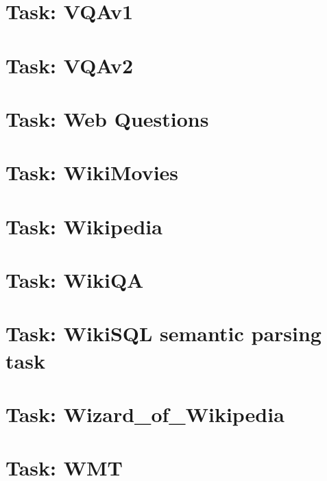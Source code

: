 \documentclass[twoside]{book}
\newcommand{\+}{\discretionary{\mbox{\scriptsize$\hookleftarrow$}}{}{}}
\begin{document}
\chapter{Task\+: V\+Q\+Av1}
\label{md_parlai_tasks_vqa_v1_README}

\chapter{Task\+: V\+Q\+Av2}
\label{md_parlai_tasks_vqa_v2_README}

\chapter{Task\+: Web Questions}
\label{md_parlai_tasks_webquestions_README}

\chapter{Task\+: Wiki\+Movies}
\label{md_parlai_tasks_wikimovies_README}

\chapter{Task\+: Wikipedia}
\label{md_parlai_tasks_wikipedia_README}

\chapter{Task\+: Wiki\+QA}
\label{md_parlai_tasks_wikiqa_README}

\chapter{Task\+: Wiki\+S\+QL semantic parsing task}
\label{md_parlai_tasks_wikisql_README}

\chapter{Task\+: Wizard\+\_\+of\+\_\+\+Wikipedia}
\label{md_parlai_tasks_wizard_of_wikipedia_README}

\chapter{Task\+: W\+MT}
\label{md_parlai_tasks_wmt_README}

\end{document}
